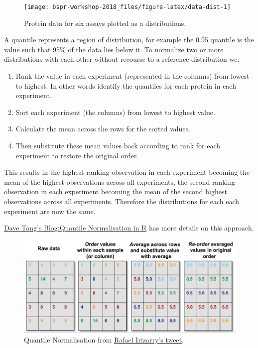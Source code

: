 \documentclass[12pt,]{book}
\providecommand{\tightlist}{%
  \setlength{\itemsep}{0pt}\setlength{\parskip}{0pt}}
\begin{document}
\begin{figure}

{\centering \texttt{[image: bspr-workshop-2018\_files/figure-latex/data-dist-1]} 

}

\caption{Protein data for six assays plotted as a distributions.}\label{fig:data-dist}
\end{figure}

A quantile represents a region of distribution, for example the 0.95 quantile
is the value such that 95\% of the data lies below it. To normalize two or more
distributions with each other without recourse to a reference distribution we:

\begin{enumerate}
\def\labelenumi{(\roman{enumi})}
\tightlist
\item
  Rank the value in each experiment (represented in the columns) from
  lowest to highest. In other words identify the quantiles for each protein
  in each experiment.
\item
  Sort each experiment (the columns) from lowest to highest value.
\item
  Calculate the mean across the rows for the sorted values.
\item
  Then substitute these mean values back according to rank for each experiment
  to restore the original order.
\end{enumerate}

This results in the highest ranking observation in each experiment
becoming the mean of the highest observations across all experiments, the
second ranking observation in each experiment becoming the mean of the
second highest observations across all experiments. Therefore the
distributions for each each experiment are now the same.

\href{https://davetang.org/muse/2014/07/07/quantile-normalisation-in-r/}{Dave Tang's Blog:Quantile Normalisation in R} has more
details on this approach.



\begin{figure}

{\centering \includegraphics[width=0.8\linewidth]{img/quant_norm} 

}

\caption{Quantile Normalisation from \href{https://twitter.com/rafalab/status/545586012219772928?ref_src=twsrc\%5Etfw}{Rafael Irizarry's tweet}.}\label{fig:quant-norm}
\end{figure}
\end{document}
